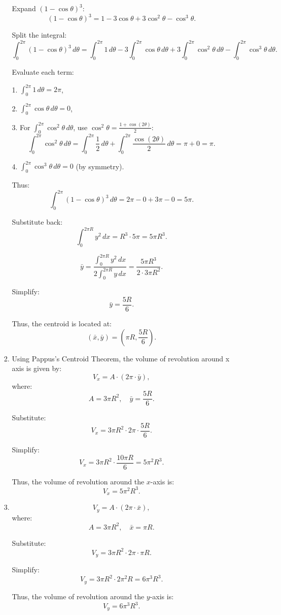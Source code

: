 \documentclass[12pt]{article}
\begin{document}
\begin{enumerate}
\begin{enumerate}
\begin{enumerate}
Expand \( (1 - \cos\theta)^3 \):
\[
(1 - \cos\theta)^3 = 1 - 3\cos\theta + 3\cos^2\theta - \cos^3\theta.
\]

Split the integral:
\[
\int_{0}^{2\pi} (1 - \cos\theta)^3 \, d\theta = \int_{0}^{2\pi} 1 \, d\theta - 3\int_{0}^{2\pi} \cos\theta \, d\theta + 3\int_{0}^{2\pi} \cos^2\theta \, d\theta - \int_{0}^{2\pi} \cos^3\theta \, d\theta.
\]

Evaluate each term:

1. \( \int_{0}^{2\pi} 1 \, d\theta = 2\pi \),

2. \( \int_{0}^{2\pi} \cos\theta \, d\theta = 0 \),

3. For \( \int_{0}^{2\pi} \cos^2\theta \, d\theta \), 
use \( \cos^2\theta = \frac{1 + \cos(2\theta)}{2} \):
   \[
   \int_{0}^{2\pi} \cos^2\theta \, d\theta = \int_{0}^{2\pi} \frac{1}{2} \, d\theta + \int_{0}^{2\pi} \frac{\cos(2\theta)}{2} \, d\theta = \pi + 0 = \pi.
   \]
   
4. \( \int_{0}^{2\pi} \cos^3\theta \, d\theta = 0 \) (by symmetry).

Thus:
\[
\int_{0}^{2\pi} (1 - \cos\theta)^3 \, d\theta = 2\pi - 0 + 3\pi - 0 = 5\pi.
\]

Substitute back:
\[
\int_{0}^{2\pi R} y^2 \, dx = R^3 \cdot 5\pi = 5\pi R^3.
\]

\[
\bar{y} = \frac{\int_{0}^{2\pi R} y^2 \, dx}{2\int_{0}^{2\pi R} y \, dx} = \frac{5\pi R^3}{2 \cdot 3\pi R^2}.
\]

Simplify:
\[
\bar{y} = \frac{5R}{6}.
\]

Thus, the centroid is located at:
\[
\left(\bar{x}, \bar{y}\right) = \left(\pi R, \frac{5R}{6}\right).
\]

\item 

Using Pappus's Centroid Theorem, the volume of revolution around x axis is given by:
\[
V_x = A \cdot (2\pi \cdot \bar{y}),
\]
where:
\[
A = 3\pi R^2, \quad \bar{y} = \frac{5R}{6}.
\]

Substitute:
\[
V_x = 3\pi R^2 \cdot 2\pi \cdot \frac{5R}{6}.
\]

Simplify:
\[
V_x = 3\pi R^2 \cdot \frac{10\pi R}{6} = 5\pi^2 R^3.
\]

Thus, the volume of revolution around the \(x\)-axis is:
\[
V_x = 5\pi^2 R^3.
\]


\item

\[
V_y = A \cdot (2\pi \cdot \bar{x}),
\]
where:
\[
A = 3\pi R^2, \quad \bar{x} = \pi R.
\]

Substitute:
\[
V_y = 3\pi R^2 \cdot 2\pi \cdot \pi R.
\]

Simplify:
\[
V_y = 3\pi R^2 \cdot 2\pi^2 R = 6\pi^3 R^3.
\]

Thus, the volume of revolution around the \(y\)-axis is:
\[
V_y = 6\pi^3 R^3.
\]

\end{enumerate}







\end{enumerate}
\end{enumerate}
\end{document}

